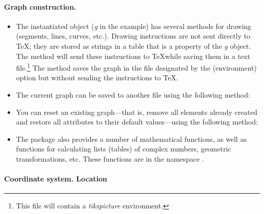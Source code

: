 \paragraph{Graph construction.}

\begin{itemize}
    \item The instantiated object (\emph{g} in the example) has several methods for drawing (segments, lines, curves, etc.). Drawing instructions are not sent directly to \TeX; they are stored as strings in a table that is a property of the \emph{g} object. The  method will send these instructions to \TeX while saving them in a text file.\footnote{This file will contain a \emph{tikzpicture} environment.} The  method saves the graph in the file designated by the (environment) option  but without sending the instructions to \TeX.

    \item The current graph can be saved to another file using the following method: 

    \item You can reset an existing graph—that is, remove all elements already created and restore all attributes to their default values—using the following method: 

    \item The \luadrawenv package also provides a number of mathematical functions, as well as functions for calculating lists (tables) of complex numbers, geometric transformations, etc. These functions are in the namespace \luadrawenv.
\end{itemize}

\paragraph{Coordinate system. Location}

